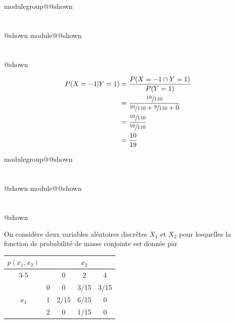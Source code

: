 \documentclass{Evaluation}
\makeatletter
\newcommand{\currentmodulekey}{}
\newcommand{\currentmoduletitle}{}
\newcommand{\currentgroupkey}{}
\newcommand{\currentgrouptitle}{}
\newcommand{\showmoduleifneeded}{%
  \ifx\currentgroupkey\empty\else
    \expandafter\ifx\csname modulegroup@\currentgroupkey @shown\endcsname\relax
      \section*{\currentgrouptitle}%
      \expandafter\gdef\csname modulegroup@\currentgroupkey @shown\endcsname{1}%
    \fi
  \fi
  \expandafter\ifx\csname module@\currentmodulekey @shown\endcsname\relax
    \section*{\currentmoduletitle}%
    \expandafter\gdef\csname module@\currentmodulekey @shown\endcsname{1}%
  \fi
}
\newenvironment{A22}{\showmoduleifneeded}{}
\newenvironment{A24}{\showmoduleifneeded}{}
\makeatother
\begin{document}
\begin{questions}
\begin{A24}
\begin{parts}
     \begin{solution}
         \begin{align*}
             P(X=-1|Y=1)&=\frac{P(X=-1\cap Y=1)}{P(Y=1)}\\
                 &= \frac{\sfrac{10}{110}}{\sfrac{10}{110}+\sfrac{9}{110}+0}\\
             &=\frac{\sfrac{10}{110}}{\sfrac{19}{110}}\\
             &=\frac{10}{19}
         \end{align*}
     \end{solution}
     

   
 \end{parts}
\end{A24}

\begin{A22}
\question {} %
On considère deux variables aléatoires discrètes $X_1$ et $X_2$ pour lesquelles la fonction de probabilité de masse conjointe est donnée par 

\begin{center}
\begin{tabular}{|cc||c|c|c|}\hline
$p(x_1,x_2)$ & & \multicolumn{3}{c|}{$x_2$}  \\ \cline{3-5}
 & & 0 & 2 & 4  \\ \hline
 & 0 & 0 & 3/15 & 3/15  \\ \hline
$x_1$ & 1 & 2/15 & 6/15  & 0  \\ \hline
 & 2 & 0 &  1/15  &  0 \\ \hline
\end{tabular}
\end{center}

\end{A22}
\end{questions}
\end{document}
